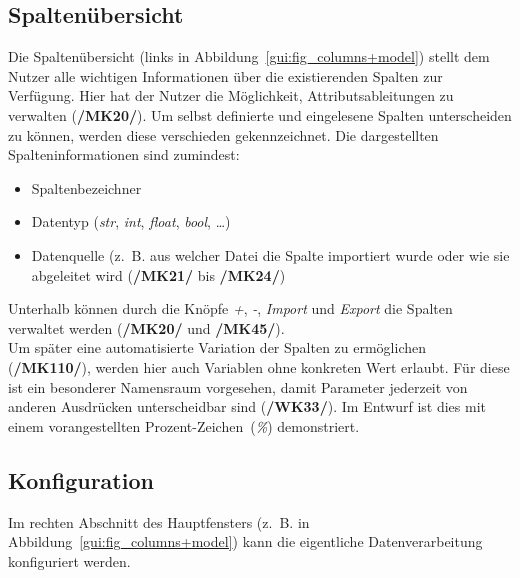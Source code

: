 \documentclass{article}
\begin{document}
\subsection{Spaltenübersicht}
Die Spaltenübersicht (links in Abbildung~\ref{gui:fig_columns+model}) stellt dem Nutzer alle wichtigen Informationen über die existierenden Spalten zur Verfügung. Hier hat der Nutzer die Möglichkeit, Attributsableitungen zu verwalten (\textbf{/MK20/}). Um selbst definierte und eingelesene Spalten unterscheiden zu können, werden diese verschieden gekennzeichnet. Die dargestellten Spalteninformationen sind zumindest:
\begin{itemize}
    \item Spaltenbezeichner
    \item Datentyp (\emph{str}, \emph{int}, \emph{float}, \emph{bool}, \dots)
    \item Datenquelle (z.~B. aus welcher Datei die Spalte importiert wurde oder wie sie abgeleitet wird (\textbf{/MK21/} bis \textbf{/MK24/})
\end{itemize}

Unterhalb können durch die Knöpfe \emph{+}, \emph{-}, \emph{Import} und \emph{Export} die Spalten verwaltet werden (\textbf{/MK20/} und \textbf{/MK45/}).\\

Um später eine automatisierte Variation der Spalten zu ermöglichen (\textbf{/MK110/}), werden hier auch Variablen ohne konkreten Wert erlaubt. Für diese ist ein besonderer Namensraum vorgesehen, damit Parameter jederzeit von anderen Ausdrücken unterscheidbar sind (\textbf{/WK33/}). Im Entwurf ist dies mit einem vorangestellten Prozent-Zeichen~(\emph{\%}) demonstriert.


\subsection{Konfiguration}
Im rechten Abschnitt des Hauptfensters (z.~B. in Abbildung~\ref{gui:fig_columns+model}) kann die eigentliche Datenverarbeitung konfiguriert werden.
\end{document}
